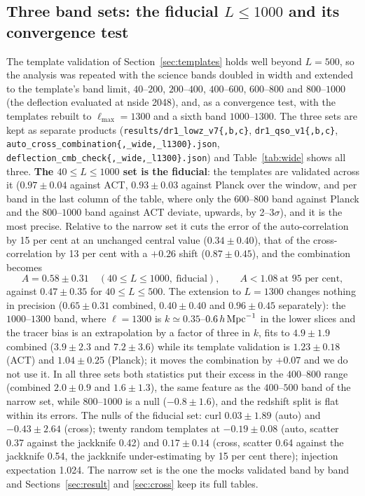 \documentclass[11pt,a4paper]{article}
\begin{document}
\subsection{Three band sets: the fiducial $L\le1000$ and its convergence test}
\label{sec:wide}
The template validation of Section~\ref{sec:templates} holds well beyond $L=500$, so the analysis was repeated with the science bands doubled in width and extended to the template's band limit, $40$--$200$, $200$--$400$, $400$--$600$, $600$--$800$ and $800$--$1000$ (the deflection evaluated at nside 2048), and, as a convergence test, with the templates rebuilt to $\ell_{\max}=1300$ and a sixth band $1000$--$1300$. The three sets are kept as separate products (\texttt{results/dr1\_lowz\_v7\{,b,c\}}, \texttt{dr1\_qso\_v1\{,b,c\}}, \texttt{auto\_cross\_combination\{,\_wide,\_l1300\}.json}, \texttt{deflection\_cmb\_check\{,\_wide,\_l1300\}.json}) and Table~\ref{tab:wide} shows all three. \textbf{The $40\le L\le1000$ set is the fiducial}: the templates are validated across it ($0.97\pm0.04$ against ACT, $0.93\pm0.03$ against Planck over the window, and per band in the last column of the table, where only the $600$--$800$ band against Planck and the $800$--$1000$ band against ACT deviate, upwards, by 2--3$\sigma$), and it is the most precise. Relative to the narrow set it cuts the error of the auto-correlation by 15 per cent at an unchanged central value ($0.34\pm0.40$), that of the cross-correlation by 13 per cent with a $+0.26$ shift ($0.87\pm0.45$), and the combination becomes
\begin{equation}
A=0.58\pm0.31\quad(40\le L\le1000,\ \text{fiducial}),\qquad A<1.08\ \text{at 95 per cent},
\end{equation}
against $0.47\pm0.35$ for $40\le L\le500$. The extension to $L=1300$ changes nothing in precision ($0.65\pm0.31$ combined, $0.40\pm0.40$ and $0.96\pm0.45$ separately): the $1000$--$1300$ band, where $\ell=1300$ is $k\simeq0.35$--$0.6\,h\,{\rm Mpc}^{-1}$ in the lower slices and the tracer bias is an extrapolation by a factor of three in $k$, fits to $4.9\pm1.9$ combined ($3.9\pm2.3$ and $7.2\pm3.6$) while its template validation is $1.23\pm0.18$ (ACT) and $1.04\pm0.25$ (Planck); it moves the combination by $+0.07$ and we do not use it. In all three sets both statistics put their excess in the $400$--$800$ range (combined $2.0\pm0.9$ and $1.6\pm1.3$), the same feature as the $400$--$500$ band of the narrow set, while $800$--$1000$ is a null ($-0.8\pm1.6$), and the redshift split is flat within its errors. The nulls of the fiducial set: curl $0.03\pm1.89$ (auto) and $-0.43\pm2.64$ (cross); twenty random templates at $-0.19\pm0.08$ (auto, scatter 0.37 against the jackknife 0.42) and $0.17\pm0.14$ (cross, scatter 0.64 against the jackknife 0.54, the jackknife under-estimating by 15 per cent there); injection expectation 1.024. The narrow set is the one the mocks validated band by band and Sections~\ref{sec:result} and \ref{sec:cross} keep its full tables.
\end{document}
